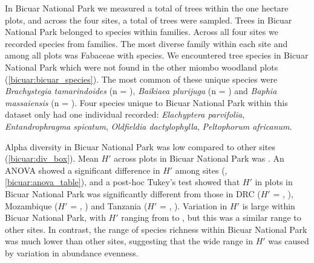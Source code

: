 \begin{refsection}
In Bicuar National Park we measured a total of \nbicuartrees{} trees within the one hectare plots, and across the four sites,  a total of \ntrees{} trees were sampled. Trees in Bicuar National Park belonged to \nbicuarspecies{} species within \nbicuarfamilies{} families. Across all four sites we recorded \nspecies{} species from \nfamilies{} families. The most diverse family within each site and among all plots was Fabaceae with \nfabaceaespecies{} species. We encountered \nbicuaruniquespecies{} tree species in Bicuar National Park which were not found in the other miombo woodland plots (\autoref{bicuar:bicuar_species}). The most common of these unique species were \textit{Brachystegia tamarindoides} (n = \nbg{}), \textit{Baikiaea plurijuga} (n = \nbp{}) and \textit{Baphia massaiensis} (n = \nbm{}). Four species unique to Bicuar National Park within this dataset only had one individual recorded: \textit{Elachyptera parvifolia}, \textit{Entandrophragma spicatum}, \textit{Oldfieldia dactylophylla}, \textit{Peltophorum africanum}.

\begin{landscape}

\end{landscape}

Alpha diversity in Bicuar National Park was low compared to other sites (\autoref{bicuar:div_box}). Mean $H'$ across plots in Bicuar National Park was \bicuarshannon{}. An ANOVA showed a significant difference in $H'$ among sites (\lmshannon{}, \autoref{bicuar:anova_table}), and a post-hoc Tukey's test showed that $H'$ in plots in Bicuar National Park was significantly different from those in DRC ($H'$ = \drcshannon{}, \tukeyshannonbicuardrc{}), Mozambique ($H'$ = \nhamshannon{}, \tukeyshannonbicuarnham{}) and Tanzania ($H'$ = \kilwashannon{}, \tukeyshannonbicuarkilwa{}). Variation in $H'$ is large within Bicuar National Park, with $H'$ ranging from \bicuarminshannon{} to \bicuarmaxshannon{}, but this was a similar range to other sites. In contrast, the range of species richness within Bicuar National Park was much lower than other sites, suggesting that the wide range in $H'$ was caused by variation in abundance evenness.


\end{refsection}
